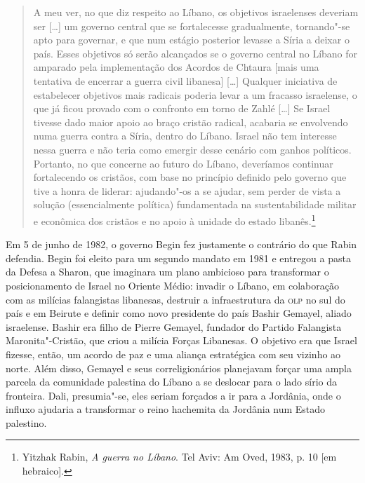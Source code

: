 \begin{quote}
A meu ver, no que diz respeito ao Líbano, os objetivos israelenses
deveriam ser {[}\ldots{}{]} um governo central que se fortalecesse gradualmente,
tornando"-se apto para governar, e que num estágio posterior levasse a Síria
a deixar o país. Esses objetivos só serão alcançados se o governo
central no Líbano for amparado pela implementação dos Acordos de Chtaura
{[}mais uma tentativa de encerrar a guerra civil libanesa{]} {[}\ldots{}{]}
Qualquer iniciativa de estabelecer objetivos mais radicais poderia levar
a um fracasso israelense, o que já ficou provado com o confronto em
torno de Zahlé {[}\ldots{}{]} Se Israel tivesse dado maior apoio ao braço cristão
radical, acabaria se envolvendo numa guerra contra a Síria, dentro do
Líbano. Israel não tem interesse nessa guerra e não teria como emergir
desse cenário com ganhos políticos. Portanto, no que concerne ao futuro
do Líbano, deveríamos continuar fortalecendo os cristãos, com base no
princípio definido pelo governo que tive a honra de liderar: ajudando"-os
a se ajudar, sem perder de vista a solução (essencialmente política)
fundamentada na sustentabilidade militar e econômica dos cristãos e no
apoio à unidade do estado libanês.\footnote{Yitzhak Rabin, \emph{A guerra no
Líbano}. Tel Aviv: Am Oved, 1983, p. 10 {[}em hebraico{]}.}
\end{quote}

Em 5 de junho de 1982, o governo Begin fez justamente o contrário do
que Rabin defendia. Begin foi eleito para um segundo
mandato em 1981 e entregou a pasta da Defesa a Sharon, que imaginara
um plano ambicioso para transformar o posicionamento de Israel
no Oriente Médio: invadir o Líbano, em colaboração com as milícias
falangistas libanesas, destruir a infraestrutura da \textsc{olp} no sul do país e
em Beirute e definir como novo presidente do país Bashir Gemayel, aliado
israelense. Bashir era filho de Pierre Gemayel, fundador do Partido
Falangista Maronita"-Cristão, que criou a milícia Forças Libanesas. O
objetivo era que Israel fizesse, então, um acordo de paz e uma aliança
estratégica com seu vizinho ao norte. Além disso, Gemayel e seus
correligionários planejavam forçar uma ampla parcela da comunidade
palestina do Líbano a se deslocar para o lado sírio da fronteira. Dali,
presumia"-se, eles seriam forçados a ir para a Jordânia, onde o influxo
ajudaria a transformar o reino hachemita da Jordânia num Estado
palestino.

